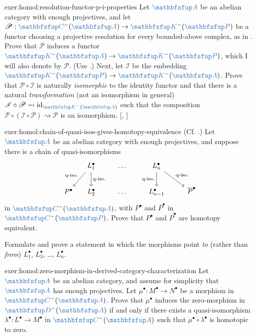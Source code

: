 \begin{exer}{\exerused{}}{exer:homol:resolution-functor-p-i-properties}
  Let $\categ{A}$ be an abelian category with enough projectives, and
  let
  $\mathscr{P} : \categ{C}^-(\categ{A}) \to \categ{K}^-(\categ{P})$ be
  a functor choosing a projective resolution for every bounded-above
  complex, as in
  . Prove that
  $\mathscr{P}$ induces a functor
  $\categ{K}^-(\categ{A}) \to \categ{K}^-(\categ{P})$, which I will
  also denote by $\mathscr{P}$.  (Use .) Next,
  let $\mathscr{I}$ be the embedding
  $\categ{K}^-(\categ{P}) \to \categ{K}^-(\categ{A})$. Prove that
  $\mathscr{P} \circ \mathscr{I}$ is naturally \emph{isomorphic} to
  the identity functor and that there is a natural
  \emph{transformation} (not an isomorphism in general)
  $\mathscr{I} \circ \mathscr{P} \rightsquigarrow \id_{\categ{K}^-
    (\categ{A})}$ such that the composition
  $\mathscr{P} \circ (\mathscr{I} \circ \mathscr{P}) \rightsquigarrow
  \mathscr{P}$ is an isomorphism. [,
  ]
\end{exer}
\begin{exer}{}{exer:homol:chain-of-quasi-isos-gives-homotopy-equivalence}
  (Cf. .)
  Let $\categ{A}$ be an abelian category with enough projectives, and
  suppose there is a chain of quasi-isomorphisms
  \[\begin{tikzcd}[column sep=small]
      & L_1^\bullet \arrow[to=2-1, "\text{q-iso.}"']  \arrow[to=2-2,
      "\text{q-iso.}"] & & \dots & & L_n^\bullet \arrow[to=2-6,
      "\text{q-iso.}"']
      \arrow[to=2-8, "\text{q-iso.}"] & \\
      P^\bullet & L_2^\bullet & & \dots & & L_{n-1}^\bullet & &
      \overline P^\bullet
    \end{tikzcd}\] in $\categ{C}^-(\categ{A})$, with $P^\bullet$ and
  $\overline P^\bullet$ in $\categ{C}^-(\categ{P})$. Prove that
  $P^\bullet$ and $\overline P^\bullet$ are homotopy equivalent.

  Formulate and prove a statement in which the morphisms point
  \emph{to} (rather than \emph{from}) $L_1^\bullet$, $L_3^\bullet$,
  \dots, $L_n^\bullet$.
\end{exer}
\begin{exer}{}{exer:homol:zero-morphism-in-derived-category-characterization}
  Let $\categ{A}$ be an abelian category, and assume for simplicity
  that $\categ{A}$ has enough projectives. Let
  $\mu^\bullet : M^\bullet \to N^\bullet$ be a morphism in
  $\categ{C}^-(\categ{A})$.  Prove that $\mu^\bullet$ induces the
  zero-morphism in $\categ{D}^-(\categ{A})$ if and only if there
  exists a quasi-isomorphism
  $\lambda^\bullet : L^\bullet \to M^\bullet$ in
  $\categ{C}^-(\categ{A})$ such that
  $\mu^\bullet \circ \lambda^\bullet$ is homotopic to zero.
\end{exer}
